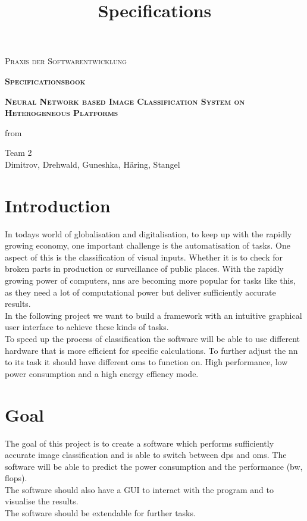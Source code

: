 \documentclass[parskip=full]{scrartcl}
\title{Specifications}
\author{}
\begin{document}
\renewcommand{\figurename}{Figure}
\begin{titlepage}
\centering
	\vspace{3cm}
	{\scshape\LARGE Praxis der Softwarentwicklung\par}
	\vspace{2cm}
	{\scshape\Huge\bfseries Specificationsbook \par}	
	\vspace{2cm}
	{\scshape\Huge\bfseries Neural Network based Image Classification System on Heterogeneous Platforms\par}
	\vspace{2cm}
	{\Large from \par}
	\vspace{0.25cm}
	{\Large Team 2\\Dimitrov, Drehwald, Guneshka, Häring, Stangel \par}
	\vfill
\end{titlepage}
\newpage
\tableofcontents
\newpage
\section{Introduction}
In todays world of globalisation and digitalisation, to keep up with the rapidly growing economy, one important challenge is the automatisation of tasks. One aspect of this is the classification of visual inputs. Whether it is to check for broken parts in production or surveillance of public places. With the rapidly growing power of computers, \glspl{nn} are becoming more popular for tasks like this, as they need a lot of computational power but deliver sufficiently accurate results.\\
In the following project we want to build a framework with an intuitive graphical user interface to achieve these kinds of tasks.\\
To speed up the process of classification the software will be able to use different hardware that is more efficient for specific calculations. To further adjust the \gls{nn} to its task it should have different \glspl{om} to function on. High \gls{performance}, low \gls{power consumption} and a high energy effiency mode.


\section{Goal}
The goal of this project is to create a software which performs sufficiently accurate \gls{image classification} and is able to switch between \glspl{dp} and \glspl{om}. The software will be able to predict the \gls{power consumption} and the \gls{performance} (\gls{bw}, \gls{flops}).\\
The software should also have a GUI to interact with the program and to visualise the results.\\
The software should be extendable for further tasks.
\end{document}
